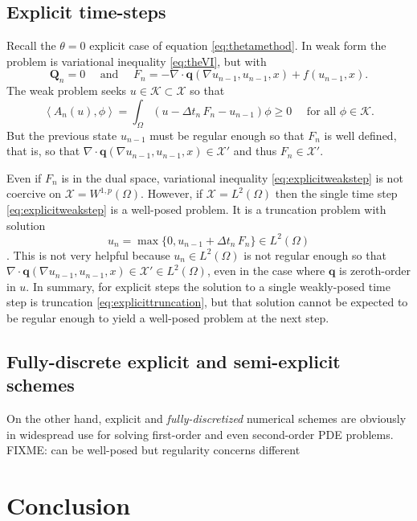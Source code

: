 \documentclass[final,leqno,onefignum,onetabnum]{siamltex1213bueler}
\newcommand\bq{\mathbf{q}}
\newcommand\bQ{\mathbf{Q}}
\newcommand{\Div}{\nabla\cdot}
\renewcommand{\grad}{\nabla}
\newcommand{\ip}[2]{\ensuremath{\left<#1,#2\right>}}
\begin{document}
\subsection{Explicit time-steps} \label{subsec:explicit}  Recall the $\theta=0$ explicit case of equation \eqref{eq:thetamethod}.  In weak form the problem is variational inequality \eqref{eq:theVI}, but with
    $$\bQ_n=0 \quad \text{ and } \quad F_n = - \Div \bq(\grad u_{n-1},u_{n-1},x) + f(u_{n-1},x).$$
The weak problem seeks $u\in\mathcal{K} \subset \mathcal{X}$ so that
\begin{equation}
\ip{A_n(u)}{\phi} = \int_\Omega (u - \Delta t_n\,F_n - u_{n-1})\phi \ge 0 \quad \text{ for all } \phi \in \mathcal{K}.  \label{eq:explicitweakstep}
\end{equation}
But the previous state $u_{n-1}$ must be regular enough so that $F_n$ is well defined, that is, so that $\Div \bq(\grad u_{n-1},u_{n-1},x) \in \mathcal{X}'$ and thus $F_n\in\mathcal{X}'$.

Even if $F_n$ is in the dual space, variational inequality \eqref{eq:explicitweakstep} is not coercive on $\mathcal{X}=W^{1,p}(\Omega)$.  However, if $\mathcal{X}=L^2(\Omega)$ then the single time step \eqref{eq:explicitweakstep} is a well-posed problem.  It is a truncation problem with solution
\begin{equation}
u_n = \max\{0,u_{n-1} + \Delta t_n\,F_n\} \in L^2(\Omega)  \label{eq:explicittruncation}
\end{equation}
\cite[page 27]{KinderlehrerStampacchia1980}.  This is not very helpful because $u_n \in L^2(\Omega)$ is not regular enough so that $\Div \bq(\grad u_{n-1},u_{n-1},x) \in \mathcal{X}' \in L^2(\Omega)$, even in the case where $\bq$ is zeroth-order in $u$.  In summary, for explicit steps the solution to a single weakly-posed time step is truncation \eqref{eq:explicittruncation}, but that solution cannot be expected to be regular enough to yield a well-posed problem at the next step.

\subsection{Fully-discrete explicit and semi-explicit schemes} \label{subsec:spaceexplicit}  On the other hand, explicit and \emph{fully-discretized} numerical schemes are obviously in widespread use for solving first-order and even second-order PDE problems.  FIXME:  can be well-posed but regularity concerns different


\section{Conclusion} \label{sec:conclusion}
\end{document}
